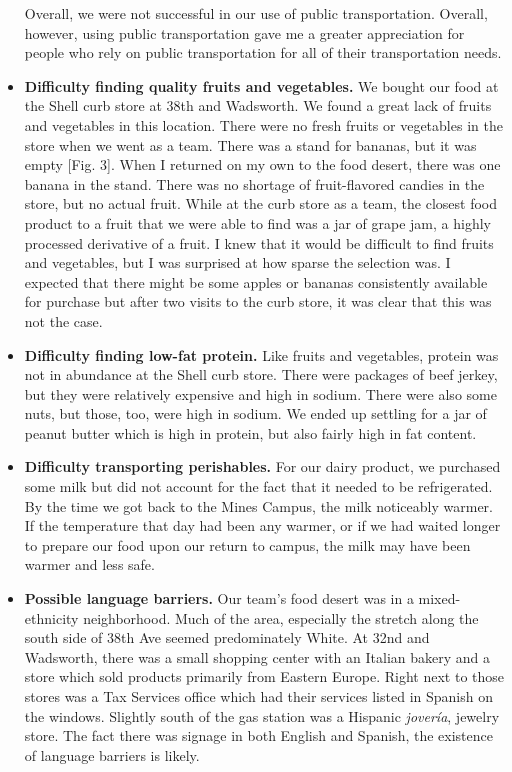 \documentclass[11pt]{article}
\begin{document}
\begin{itemize}
        Overall, we were not successful in our use of public transportation. Overall, however, using
        public transportation gave me a greater appreciation for people who rely on public
        transportation for all of their transportation needs.

    \item \textbf{Difficulty finding quality fruits and vegetables.} We bought our food at the
        Shell curb store at 38th and Wadsworth. We found a great lack of fruits and vegetables in
        this location. There were no fresh fruits or vegetables in the store when we went as a team.
        There was a stand for bananas, but it was empty [Fig. 3]. When I returned on my own to the
        food desert, there was one banana in the stand. There was no shortage of fruit-flavored
        candies in the store, but no actual fruit. While at the curb store as a team, the closest
        food product to a fruit that we were able to find was a jar of grape jam, a highly processed
        derivative of a fruit. I knew that it would be difficult to find fruits and vegetables, but
        I was surprised at how sparse the selection was. I expected that there might be some apples
        or bananas consistently available for purchase but after two visits to the curb store, it
        was clear that this was not the case.

    \item \textbf{Difficulty finding low-fat protein.} Like fruits and vegetables, protein was not
        in abundance at the Shell curb store. There were packages of beef jerkey, but they were
        relatively expensive and high in sodium. There were also some nuts, but those, too, were
        high in sodium. We ended up settling for a jar of peanut butter which is high in protein,
        but also fairly high in fat content.

    \item \textbf{Difficulty transporting perishables.} For our dairy product, we purchased some
        milk but did not account for the fact that it needed to be refrigerated. By the time we got
        back to the Mines Campus, the milk noticeably warmer. If the temperature that day had been
        any warmer, or if we had waited longer to prepare our food upon our return to campus, the
        milk may have been warmer and less safe.

    \item \textbf{Possible language barriers.} Our team's food desert was in a mixed-ethnicity
        neighborhood. Much of the area, especially the stretch along the south side of 38th Ave
        seemed predominately White. At 32nd and Wadsworth, there was a small shopping center with an
        Italian bakery and a store which sold products primarily from Eastern Europe. Right next to
        those stores was a Tax Services office which had their services listed in Spanish on the
        windows. Slightly south of the gas station was a Hispanic \textit{jover\'{i}a}, jewelry
        store. The fact there was signage in both English and Spanish, the existence of language
        barriers is likely.
\end{itemize}
\end{document}
